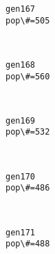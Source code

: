 \documentclass[11pt]{article}
\begin{document}
    \begin{Verbatim}[commandchars=\\\{\}]
gen167
pop\#=505

    \end{Verbatim}

    \begin{center}
    \end{center}
    { \hspace*{\fill} \\}
    
    \begin{Verbatim}[commandchars=\\\{\}]
gen168
pop\#=560

    \end{Verbatim}

    \begin{center}
    \end{center}
    { \hspace*{\fill} \\}
    
    \begin{Verbatim}[commandchars=\\\{\}]
gen169
pop\#=532

    \end{Verbatim}

    \begin{center}
    \end{center}
    { \hspace*{\fill} \\}
    
    \begin{Verbatim}[commandchars=\\\{\}]
gen170
pop\#=486

    \end{Verbatim}

    \begin{center}
    \end{center}
    { \hspace*{\fill} \\}
    
    \begin{Verbatim}[commandchars=\\\{\}]
gen171
pop\#=488

    \end{Verbatim}
\end{document}
